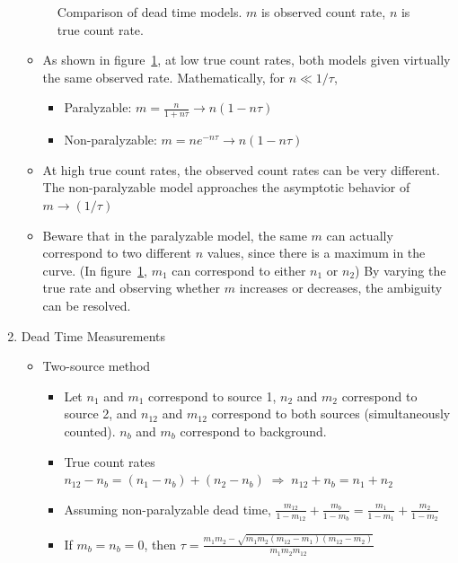 \begin{enumerate}
\begin{figure}[ht]
        \caption{Comparison of dead time models. $m$ is observed count rate, $n$ is true count rate.}
        \label{fig:dead_time_models_comparison}
    \end{figure}
    \begin{itemize}
        \item As shown in figure~\ref{fig:dead_time_models_comparison}, at low true count rates, both models given virtually the same observed rate. Mathematically, for $n\ll1/\tau$, 
        \begin{itemize}
            \item Paralyzable: $m=\frac{n}{1+n\tau}\rightarrow n(1-n\tau)$
            \item Non-paralyzable: $m=ne^{-n\tau}\rightarrow n(1-n\tau)$
        \end{itemize}
        \item At high true count rates, the observed count rates can be very different. The non-paralyzable model approaches the asymptotic behavior of $m\rightarrow(1/\tau)$
        \item Beware that in the paralyzable model, the same $m$ can actually correspond to two different $n$ values, since there is a maximum in the curve. (In figure~\ref{fig:dead_time_models_comparison}, $m_1$ can correspond to either $n_1$ or $n_2$) By varying the true rate and observing whether $m$ increases or decreases, the ambiguity can be resolved.
    \end{itemize}
    \item Dead Time Measurements
    \begin{itemize}
        \item Two-source method
        \begin{itemize}
            \item Let $n_1$ and $m_1$ correspond to source 1, $n_2$ and $m_2$ correspond to source 2, and $n_{12}$ and $m_{12}$ correspond to both sources (simultaneously counted). $n_b$ and $m_b$ correspond to background.
            \item True count rates $n_{12}-n_b=(n_1-n_b)+(n_2-n_b)\;\Rightarrow\;n_{12}+n_b=n_1+n_2$\\
            \item Assuming non-paralyzable dead time, $\frac{m_{12}}{1-m_{12}}+\frac{m_b}{1-m_b}=\frac{m_1}{1-m_1}+\frac{m_2}{1-m_2}$\\
            \item If $m_b=n_b=0$, then $\tau=\frac{m_1m_2-\sqrt{m_1m_2(m_{12}-m_1)(m_{12}-m_2)}}{m_1m_2m_{12}}$

\end{itemize}
\end{itemize}
\end{enumerate}
